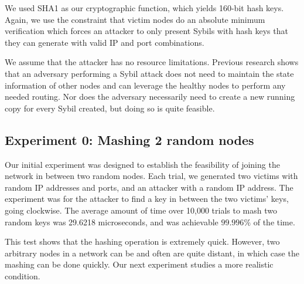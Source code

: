 We used SHA1 as our cryptographic function, which yields 160-bit hash keys.
Again, we use the constraint that victim nodes do an absolute minimum verification which forces an attacker to only present Sybils with hash keys that they can generate with valid IP and port combinations.



We assume that the attacker has no resource limitations.
Previous research \cite{sybilbit} shows that an adversary performing a Sybil attack does not need to maintain the state information of other nodes and can leverage the healthy nodes to perform any needed routing.
Nor does the adversary necessarily need to create a new running copy for every Sybil created, but doing so is quite feasible. 






\subsection{Experiment 0: Mashing 2 random nodes}
Our initial experiment was designed to establish the feasibility of joining the network in between two random nodes.
Each trial, we generated two victims with random IP addresses and ports, and an attacker with a random IP address.
The experiment was for the attacker to find a key in between the two victims' keys, going clockwise.
The average amount of time over 10,000 trials to mash two random keys was 29.6218 microseconds, and was achievable $ 99.996\%$ of the time.

This test shows that the hashing operation is extremely quick.
However, two arbitrary nodes in a network can be and often are quite distant, in which case the mashing can be done quickly.
Our next experiment studies a more realistic condition.


